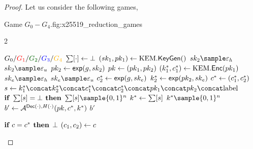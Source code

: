 \documentclass{article}
\begin{document}
        \begin{proof}
            Let us consider the following games,

            \begin{gamefigure}{Game $G_0 - G_4$.}{fig:x25519_reduction_games}
                \begin{games}{2}
                    \begin{gameenv}{\game $G_0 / \textcolor{\gone}{G_1} / \textcolor{\gtwo}{G_2} / \textcolor{\gthree}{G_3} / \textcolor{\gfour}{G_4}$}
                        \State $\sum[\cdot] \leftarrow \bot$
                        \State $(sk_1, pk_1) \leftarrow \text{KEM}.\textsf{KeyGen}()$
                        \State $\sk_2 \sample \honestexponent$
                        \BeginBox[draw=\gone]
                            \State $\sk_2 \sample \exponent$
                        \EndBox
                        \State $pk_2 \leftarrow \textsf{exp}(g, sk_2)$
                        \State $pk \leftarrow (pk_1, pk_2)$
                        \State $(k^*_1, c^*_1) \leftarrow \text{KEM}.\textsf{Enc}(pk_1)$
                        \State $\sk_e \sample \honestexponent$
                        \BeginBox[draw=\gone]
                            \State $\sk_e \sample \exponent$
                        \EndBox
                        \State $c^*_2 \leftarrow \textsf{exp}(g, sk_e)$
                        \State $k^*_2 \leftarrow \textsf{exp}(pk_2, sk_e)$
                        \State $c^* \leftarrow (c^*_1, c^*_2)$
                        \State $s \assign  k^*_1 \concat k^*_2 \concat c^*_1\concat c^*_2 \concat \pk_1 \concat \pk_2 \concat \text{label}$
                        \State $\textbf{if } \sum[s] = \bot \textbf{ then}$
                            \State \quad $\ROMtable[s] \sample \bits^{n}$
                            \State $k^* \leftarrow \sum[s]$
                            \BeginBox[draw=\gfour]
                                \State $k^* \sample \bits^{n}$
                            \EndBox
                            \State $b' \leftarrow \mathcal{A}^{\textsf{Dec}(\cdot), H(\cdot)}(pk, c^*, k^*)$
                            \State \Return $b'$
                        \end{gameenv}
                        \gamebreak
                        \begin{gameenv}{\oracledec}
                            \State $\textbf{if } c = c^* \textbf{ then}$
                                \State \quad \Return $\bot$
                                \State $(c_1, c_2) \leftarrow c$

\end{gameenv}
\end{games}
\end{gamefigure}
\end{proof}
\end{document}
